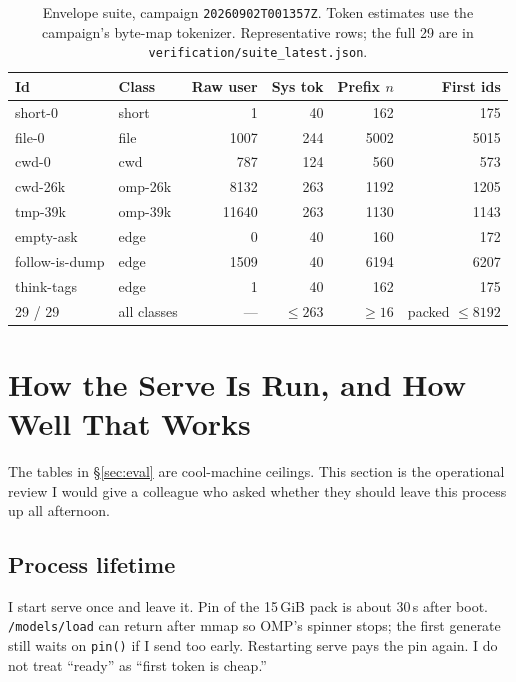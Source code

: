 \begin{table}[ht]
\centering
\caption{Envelope suite, campaign \texttt{20260902T001357Z}. Token estimates use the campaign's byte-map tokenizer. Representative rows; the full 29 are in \texttt{verification/suite\_latest.json}.}
\label{tab:suite}
{\small
\begin{tabular}{@{}llrrrr@{}}
\toprule
Id & Class & Raw user & Sys tok & Prefix $n$ & First ids \\
\midrule
short-0 & short & 1 & 40 & 162 & 175 \\
file-0 & file & 1007 & 244 & 5002 & 5015 \\
cwd-0 & cwd & 787 & 124 & 560 & 573 \\
cwd-26k & omp-26k & 8132 & 263 & 1192 & 1205 \\
tmp-39k & omp-39k & 11640 & 263 & 1130 & 1143 \\
empty-ask & edge & 0 & 40 & 160 & 172 \\
follow-is-dump & edge & 1509 & 40 & 6194 & 6207 \\
think-tags & edge & 1 & 40 & 162 & 175 \\
\midrule
29 / 29 & all classes & --- & $\le 263$ & $\ge 16$ & packed $\le 8192$ \\
\bottomrule
\end{tabular}
}
\end{table}

\section{How the Serve Is Run, and How Well That Works}
\label{sec:ops}

The tables in \S\ref{sec:eval} are cool-machine ceilings. This section is the operational review I would give a colleague who asked whether they should leave this process up all afternoon.

\subsection{Process lifetime}

I start serve once and leave it. Pin of the 15\,GiB pack is about 30\,s after boot. \texttt{/models/load} can return after mmap so OMP's spinner stops; the first generate still waits on \texttt{pin()} if I send too early. Restarting serve pays the pin again. I do not treat ``ready'' as ``first token is cheap.''

